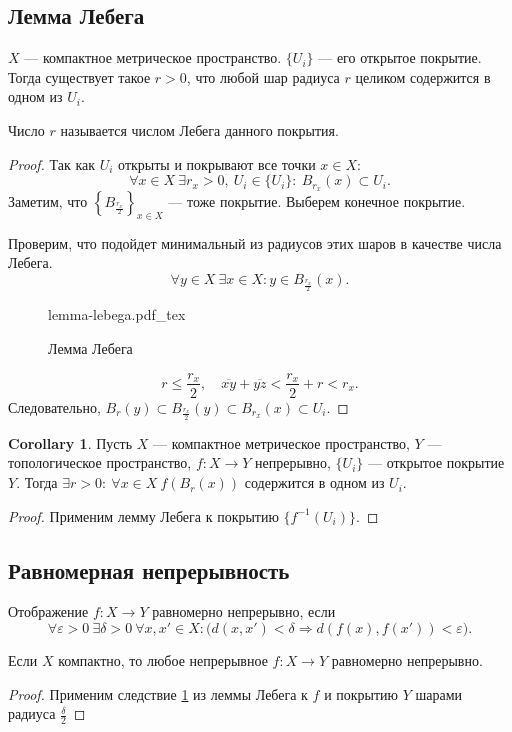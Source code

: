 \documentclass[11pt]{book}
\newcommand{\incfig}[1]{%
    \def\svgwidth{\columnwidth}
    {#1.pdf_tex}
}
\renewcommand{\le}{\leqslant}
\theoremstyle{definition}
\theoremstyle{plain}
\theoremstyle{plain}
\theoremstyle{definition}
\newtheorem*{cor}{Corollary}
\theoremstyle{remark}
\begin{document}
\subsection{Лемма Лебега}
\begin{thm}
    $ X$ --- компактное метрическое пространство.  $ \{U_i\}$ --- его открытое покрытие.
    Тогда существует такое $ r>0$, что любой шар радиуса $ r$ целиком содержится в одном из  $ U_i$.
    \begin{defn}
	Число $ r$ называется {\sf числом Лебега} данного покрытия.
    \end{defn}
\end{thm}
\begin{proof}
    Так как $ U_i$ открыты и покрывают все точки $ x \in X$:
    \[
	\forall x \in X ~ \exists r_x >0, ~ U_i \in  \{U_i\}: ~ B_{r_x}(x) \subset U_i
    .\]
    Заметим, что $ \left\{B_{\frac{r_x}{2}}\right\}_{x \in X}$ --- тоже покрытие. Выберем конечное покрытие.

    Проверим, что подойдет минимальный из радиусов этих шаров в качестве числа Лебега.
    \[
	\forall y \in X ~\exists x \in X: y \in B_{\frac{r_x}{2}}(x)
    .\]
    \begin{figure}[ht]
	\centering
	\incfig{lemma-lebega}
	\caption{Лемма Лебега}
	\label{fig:lemma-lebega}
    \end{figure}
    \[
	r \le  \frac{r_x}{2}, \quad \overline{xy} + \overline{yz} <  \frac{r_x}{2} + r <  r_x
    .\]
    Следовательно, $ B_r (y) \subset B_{\frac{r_x}{2}}(y) \subset B_{r_x}(x) \subset U_i$.
\end{proof}
\begin{cor}\label{cor_ll}
    Пусть $ X$ --- компактное метрическое пространство,  $ Y$ ---  топологическое пространство, $ f: X \to  Y$ непрерывно, $ \{U_i\}$ --- открытое покрытие $ Y$.
    Тогда  $ \exists r >0: ~ \forall x \in  X ~ f(B_r(x)) \text{ содержится в одном из } U_i$.
\end{cor}
\begin{proof}
    Применим лемму Лебега к покрытию $ \{f^{-1}(U_i)\}$.
\end{proof}
\subsection{Равномерная непрерывность}
\begin{defn}
    Отображение $ f: X \to  Y$ {\sf равномерно непрерывно}, если
    \[
	\forall  \varepsilon >0 ~ \exists  \delta > 0 ~ \forall x, x' \in  X:  \bigl(d(x, x') < \delta \Longrightarrow  d(f(x), f(x')) < \varepsilon\bigr)
    .\]
\end{defn}
\begin{thm}
    Если $ X$ компактно, то любое непрерывное  $ f: X \to  Y$ равномерно непрерывно.
\end{thm}
\begin{proof}
    Применим следствие \ref{cor_ll} из леммы Лебега к $ f$ и покрытию  $ Y$ шарами радиуса $ \frac{\delta}{2}$
\end{proof}
\end{document}
